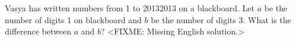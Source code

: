 \problem
Vasya has written numbers from 1 to 20132013 on a blackboard.
Let $a$ be the number of digits 1 on blackboard and $b$ be the number of digits
3.
What is the difference between $a$ and $b$?
\solution
<FIXME: Missing English solution.>
\endproblem
